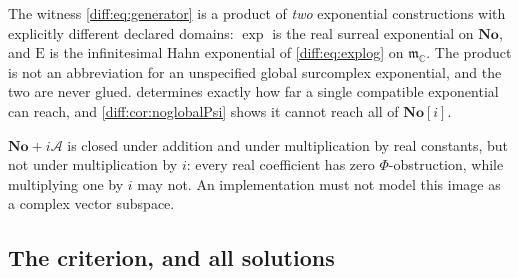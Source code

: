 \documentclass[11pt,letterpaper]{article}
\numberwithin{equation}{section}
\theoremstyle{definition}
\theoremstyle{remark}
\newcommand{\No}{\mathbf{No}}
\newcommand{\SC}{\mathbf{No}[i]}
\newcommand{\C}{\mathbb C}
\newcommand{\mm}{\mathfrak m}
\newcommand{\Acl}{\mathcal A}
\newcommand{\Emm}{\mathrm{E}}
\begin{document}
\begin{warning}
\label{diff:warn:twoexponentials}
The witness \cref{diff:eq:generator} is a product of \emph{two} exponential
constructions with explicitly different declared domains: $\exp$ is the real
surreal exponential on $\No$, and $\Emm$ is the infinitesimal Hahn exponential
of \cref{diff:eq:explog} on $\mm_{\C}$. The product is not an abbreviation for
an unspecified global surcomplex exponential, and the two are never glued.
 determines exactly how far a single compatible
exponential can reach, and \cref{diff:cor:noglobalPsi} shows it cannot reach
all of $\SC$.
\end{warning}

\begin{warning}
\label{diff:warn:notClinear}
$\No+i\Acl$ is closed under addition and under multiplication by real
constants, but not under multiplication by $i$: every real coefficient has
zero $\Phi$-obstruction, while multiplying one by $i$ may not. An implementation must
not model this image as a complex vector subspace.
\end{warning}

\subsection{The criterion, and all solutions}
\label{diff:sub:criterion}
\end{document}
